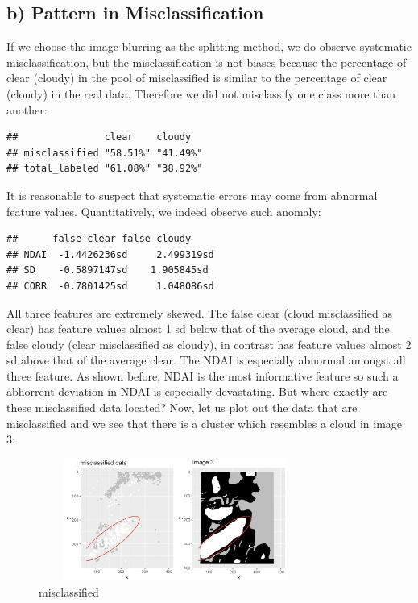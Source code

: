 \documentclass[jou]{apa}%
\begin{document}
\subsection{b) Pattern in Misclassification}
If we choose the image blurring as the splitting method, we do observe systematic misclassification, but the misclassification is not biases because the percentage of clear (cloudy) in the pool of misclassified is similar to the percentage of clear (cloudy) in the real data. Therefore we did not misclassify one class more than another:
\begin{verbatim}
##               clear    cloudy  
## misclassified "58.51%" "41.49%"
## total_labeled "61.08%" "38.92%"
\end{verbatim}
It is reasonable to suspect that systematic errors may come from abnormal feature values. Quantitatively, we indeed observe such anomaly:
\begin{verbatim}
##      false clear false cloudy
## NDAI  -1.4426236sd     2.499319sd
## SD    -0.5897147sd    1.905845sd
## CORR  -0.7801425sd     1.048086sd
\end{verbatim}
All three features are extremely skewed. The false clear (cloud misclassified as clear) has feature values almost 1 sd below that of the average cloud, and the false cloudy (clear misclassified as cloudy), in contrast has feature values almost 2 sd above that of the average clear. The NDAI is especially abnormal amongst all three feature. As shown before, NDAI is the most informative feature so such a abhorrent deviation in NDAI is especially devastating. But where exactly are these misclassified data located? Now, let us plot out the data that are misclassified and we see that there is a cluster which resembles a cloud in image 3: 
\begin{figure}[H]\centering\hspace*{-1cm}\includegraphics[width = 9cm, height = 4cm]{misclassify}\vspace*{-0.5cm}\caption{misclassified}\end{figure}
\end{document}
